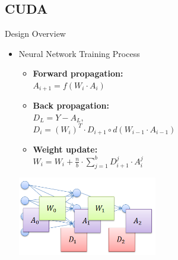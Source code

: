 \subsection{CUDA}
\begin{frame}{Design Overview}

\begin{itemize}

\item{ Neural Network Training Process}
\begin{itemize}
\item{\textbf{Forward propagation:}  \\$A_{i+1} = f(W_{i} \cdot A_{i})$}
\item{\textbf{Back propagation:}  \\$D_L =Y - A_L$,\\ $D_i = (W_{i})^{T}\cdot D_{i+1} \circ d(W_{i-1} \cdot A_{i-1})$}
\item{\textbf{Weight update:} \\$W_{i} = W_{i} + \frac{n}{b} \cdot \sum_{j=1}^{b} D_{i+1}^{j} \cdot A_{i}^j$}
\end{itemize}

\begin{center}
\includegraphics[width=2.4in]{gpu_neural_net_data.png}
\end{center}

\end{itemize}

\end{frame}

